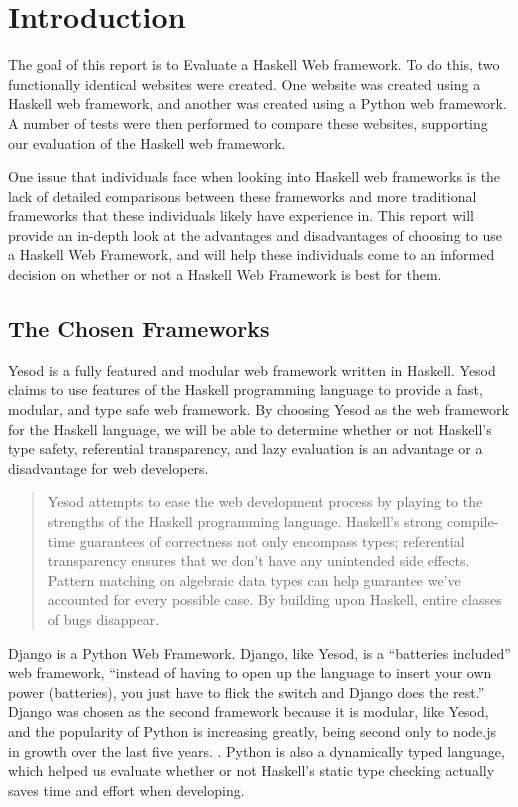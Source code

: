 \chapter{Introduction}
\label{chap:Introduction}

The goal of this report is to Evaluate a Haskell Web framework. To do this, two functionally
identical websites were created. One website was created using a Haskell web framework,
and another was created using a Python web framework. A number of tests were then performed
to compare these websites, supporting our evaluation of the Haskell web framework.

One issue that individuals face when looking into Haskell web frameworks is the lack of
detailed comparisons between these frameworks and more traditional frameworks that these
individuals likely have experience in. This report will provide an in-depth look at the
advantages and disadvantages of choosing to use a Haskell Web Framework, and will help
these individuals come to an informed decision on whether or not a Haskell Web Framework is
best for them.

\section{The Chosen Frameworks}

Yesod is a fully featured and modular web framework written in Haskell. Yesod claims to use
features of the Haskell programming language to provide a fast, modular, and type safe web framework. By
choosing Yesod as the web framework for the Haskell language, we will be able to determine
whether or not Haskell's type safety, referential transparency, and lazy evaluation is an advantage
or a disadvantage for web developers.

\begin{quote}
Yesod attempts to ease the web development process by playing to the strengths of the Haskell 
programming language. Haskell’s strong compile-time guarantees of correctness not only encompass 
types; referential transparency ensures that we don’t have any unintended side effects. Pattern 
matching on algebraic data types can help guarantee we’ve accounted for every possible case. 
By building upon Haskell, entire classes of bugs disappear. \parencite[Introduction]{yesodBook}
\end{quote}

Django is a Python Web Framework. Django, like Yesod, is a ``batteries included'' web framework,
``instead of having to open up the language to insert your own power (batteries), you just have
to flick the switch and Django does the rest.'' Django was chosen as the second framework
because it is modular, like Yesod, and the popularity of Python is increasing greatly, being
second only to node.js in growth over the last five years. \parencite{djangoBookReasons}. 
Python is also a dynamically typed language, which helped us evaluate whether or not Haskell's static
type checking actually saves time and effort when developing.

